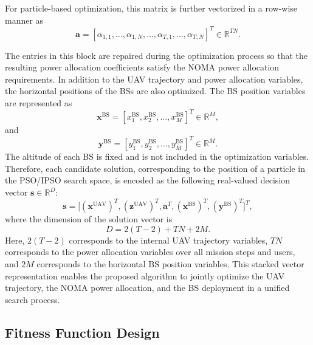 \documentclass[conference]{IEEEtran}
\begin{document}
For particle-based optimization, this matrix is further vectorized in a row-wise manner as
\begin{equation}
\mathbf{a} = \left[ \alpha_{1,1},\ldots,\alpha_{1,N}, \ldots, \alpha_{T,1},\ldots,\alpha_{T,N} \right]^T \in \mathbb{R}^{TN}.
\end{equation}

The entries in this block are repaired during the optimization process so that the resulting power allocation coefficients satisfy the NOMA power allocation requirements. In addition to the UAV trajectory and power allocation variables, the horizontal positions of the BSs are also optimized. The BS position variables are represented as 
\begin{equation} \mathbf{x}^{\mathrm{BS}} = \left[ x_1^{\mathrm{BS}}, x_2^{\mathrm{BS}}, \ldots, x_M^{\mathrm{BS}} \right]^T \in \mathbb{R}^{M}, \end{equation} 
and 
\begin{equation} \mathbf{y}^{\mathrm{BS}} = \left[ y_1^{\mathrm{BS}}, y_2^{\mathrm{BS}}, \ldots, y_M^{\mathrm{BS}} \right]^T \in \mathbb{R}^{M}. \end{equation} 
The altitude of each BS is fixed and is not included in the optimization variables. Therefore, each candidate solution, corresponding to the position of a particle in the PSO/IPSO search space, is encoded as the following real-valued decision vector $\mathbf{s} \in \mathbb{R}^{D}$: 
\begin{equation}
\mathbf{s} = \big[ (\mathbf{x}^{\mathrm{UAV}})^T, (\mathbf{z}^{\mathrm{UAV}})^T, \mathbf{a}^T, (\mathbf{x}^{\mathrm{BS}})^T, (\mathbf{y}^{\mathrm{BS}})^T \big]^T,
\end{equation} 
where the dimension of the solution vector is 
\begin{equation} D = 2(T-2) + TN + 2M. \end{equation} 
Here, $2(T-2)$ corresponds to the internal UAV trajectory variables, $TN$ corresponds to the power allocation variables over all mission steps and users, and $2M$ corresponds to the horizontal BS position variables. This stacked vector representation enables the proposed algorithm to jointly optimize the UAV trajectory, the NOMA power allocation, and the BS deployment in a unified search process.

\subsection{Fitness Function Design}
\label{subsec:fitness_function}
\end{document}
